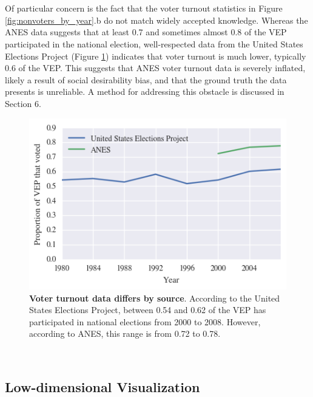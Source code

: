 \documentclass{article}
\begin{document}
	\hfill \\\\
	Of particular concern is the fact that the voter turnout statistics in Figure \ref{fig:nonvoters_by_year}.b do not match widely accepted knowledge. Whereas the ANES data suggests that at least 0.7 and sometimes almost 0.8 of the VEP participated in the national election, well-respected data from the United States Elections Project (Figure \ref{fig:voter_turnout}) indicates that voter turnout is much lower, typically 0.6 of the VEP. This suggests that ANES voter turnout data is severely inflated, likely a result of social desirability bias, and that the ground truth the data presents is unreliable. A method for addressing this obstacle is discussed in Section 6.
	\begin{figure}[h!]
		\begin{center}
			\includegraphics*[width=0.5\linewidth]{voter_turnout}
			\caption{\textbf{Voter turnout data differs by source}. According to the United States Elections Project, between 0.54 and 0.62 of the VEP has participated in national elections from 2000 to 2008. However, according to ANES, this range is from 0.72 to 0.78.}
			\label{fig:voter_turnout}
		\end{center}
	\end{figure}
	\hfill \\
	
	\subsection{Low-dimensional Visualization}
	
\end{document}
